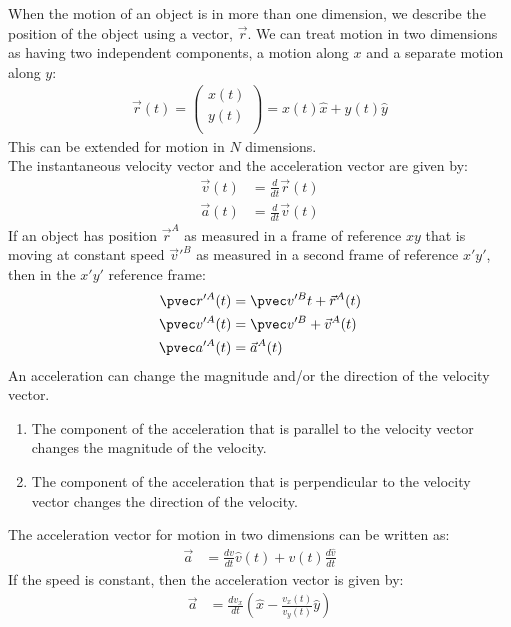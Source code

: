 \begin{chapterSummary}When the motion of an object is in more than one dimension, we describe the position of the object using a vector, $\vec{r}$. We can treat motion in two dimensions as having two independent components, a motion along $x$ and  a separate motion along $y$:
\begin{align*}
\vec r(t) = \begin{pmatrix}
          x(t) \\
          y(t) \\
        \end{pmatrix}= x(t) \hat x + y(t) \hat y
\end{align*}
This can be extended for motion in $N$ dimensions.\\

The instantaneous velocity vector and the acceleration vector are given by:
\begin{align*}
\vec v(t) &=\frac{d}{dt}\vec r(t)\\
\vec a(t) &= \frac{d}{dt}\vec v(t)
\end{align*}
If an object has position $\vec{r}^A$ as measured in a frame of reference $xy$ that is moving at constant speed $\vec{v}'^B$ as measured in a second frame of reference $x'y'$, then in the $x'y'$ reference frame:
\begin{align*}
\pvec r'^A(t) &= \pvec v'^Bt+\vec r^A(t)\\
\pvec v'^A(t) &=\pvec v'^B+\vec v^A(t)\\
\pvec a'^A(t)&=\vec a^A(t)
\end{align*}
An acceleration can change the magnitude and/or the direction of the velocity vector.
\begin{enumerate}
\item The component of the acceleration that is parallel to the velocity vector changes the magnitude of the velocity.
\item The component of the acceleration that is perpendicular to the velocity vector changes the direction of the velocity.
\end{enumerate}
The acceleration vector for motion in two dimensions can be written as:
\begin{align*}
\vec a&=\frac{dv}{dt}\hat v(t)+v(t)\frac{d\hat v}{dt}
\end{align*}
If the speed is constant, then the acceleration vector is given by:
\begin{align*}
\vec a&=\frac{dv_x}{dt} \left(\hat x - \frac{v_x(t)}{v_y(t)}\hat y\right)
\end{align*}


\end{chapterSummary}
